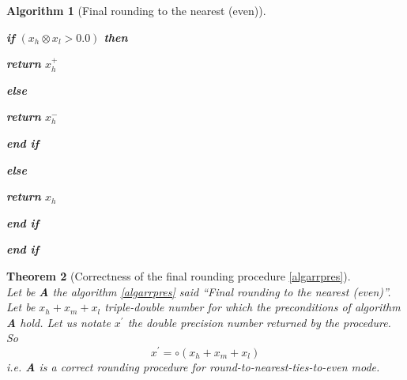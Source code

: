 \documentclass[a4paper,10pt,twoside]{article}
\newtheorem{theorem}{Theorem}[section]
\newtheorem{algorithm}[theorem]{Algorithm}
\newcommand{\hi}{\ensuremath{\mathit{h}}}
\newcommand{\mi}{\ensuremath{\mathit{m}}}
\newcommand{\lo}{\ensuremath{\mathit{l}}}
\newcommand{\ouvguill}{``}
\newcommand{\fermguill}{''}
\begin{document}
\begin{algorithm}[Final rounding to the nearest (even)]
\begin{center}
\begin{minipage}[b]{80mm}
\begin{center}
\begin{minipage}[b]{70mm}
\vspace{-2.4mm}
\begin{center}
\begin{minipage}[b]{60mm}
{\bf if} $\left( x_\hi \otimes x_\lo > 0.0 \right)$ {\bf then} 
\vspace{-2.4mm}
\begin{center}
\begin{minipage}[b]{50mm}
\vspace{-2.4mm}
{\bf return } $x_\hi^+ $
\end{minipage}
\end{center}
\vspace{-2.4mm}
{\bf else}
\vspace{-2.4mm}
\begin{center}
\begin{minipage}[b]{50mm}
\vspace{-2.4mm}
{\bf return } $x_\hi^- $
\end{minipage}
\end{center}
\vspace{-2.4mm}
{\bf end if} 
\end{minipage}
\end{center}
\vspace{-2.4mm}
{\bf else}
\vspace{-2.4mm}
\begin{center}
\begin{minipage}[b]{60mm}
\vspace{-2.4mm}
{\bf return } $x_\hi $
\end{minipage}
\end{center}
\vspace{-2.4mm}
{\bf end if} 
\end{minipage}
\end{center}
\vspace{-2.4mm}
{\bf end if} 
\end{minipage}
\end{center}
\end{algorithm}
\begin{theorem}[Correctness of the final rounding procedure \ref{algarrpres}]\label{corralgpluspres} ~\\
Let be {\bf A} the algorithm \ref{algarrpres} said \ouvguill Final rounding to the nearest (even)\fermguill.
Let be $x_\hi + x_\mi + x_\lo$ triple-double number for which the preconditions of algorithm {\bf A} hold.
Let us notate $x^\prime$ the double precision number returned by the procedure. \\
So
$$x^\prime = \circ \left( x_\hi + x_\mi + x_\lo \right)$$
i.e. {\bf A} is a correct rounding procedure for round-to-nearest-ties-to-even mode.
\end{theorem}
\end{document}
